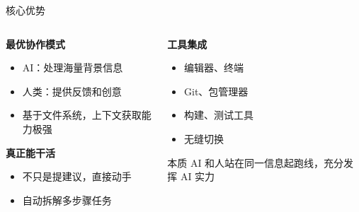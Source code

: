 \documentclass[aspectratio=169,xcolor=dvipsnames]{beamer}
\begin{document}
\begin{frame}{核心优势}
  \begin{columns}
    \begin{column}{0.48\textwidth}
      \textbf{最优协作模式}
      \begin{itemize}
        \item AI：处理海量背景信息
        \item 人类：提供反馈和创意
        \item 基于文件系统，上下文获取能力极强
      \end{itemize}

      \vspace{0.5cm}

      \textbf{真正能干活}
      \begin{itemize}
        \item 不只是提建议，直接动手
        \item 自动拆解多步骤任务
      \end{itemize}
    \end{column}
    \begin{column}{0.48\textwidth}
      \textbf{工具集成}
      \begin{itemize}
        \item 编辑器、终端
        \item Git、包管理器
        \item 构建、测试工具
        \item 无缝切换
      \end{itemize}

      \vspace{0.5cm}

      \begin{exampleblock}{本质}
        AI 和人站在同一信息起跑线，充分发挥 AI 实力
      \end{exampleblock}
    \end{column}
  \end{columns}
\end{frame}
\end{document}
